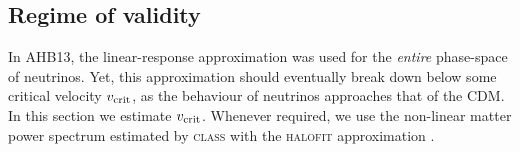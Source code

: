 \documentclass[useAMS, usenatbib]{mnras}
\newcommand{\beq}{\begin{equation}}
\newcommand{\eeq}{\end{equation}}
\newcommand{\earr}{\end{eqnarray}}
\newcommand{\bs}{\boldsymbol}
\newcommand{\spb}[1]{{\textcolor{green}{[{\bf SPB}: #1]}}}
\newcommand{\yah}[1]{{\textcolor{blue}{[{\bf YAH}: #1]}}}
\begin{document}
%

%


\subsection{Regime of validity} \label{sec:validity}

In AHB13, the linear-response approximation was used for the \emph{entire} phase-space of neutrinos. Yet, this approximation should eventually break down below some critical velocity $v_{\rm crit}$, as the behaviour of neutrinos approaches that of the CDM. In this section we estimate $v_{\rm crit}$. Whenever required, we use the non-linear matter power spectrum estimated by \textsc{class} \citep{Lesgourgues_11, Blas_11} with the \textsc{halofit} approximation \citep{Smith_2003}.
\end{document}
